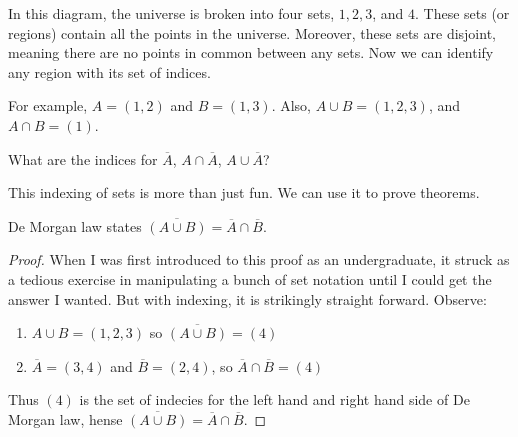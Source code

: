\begin{example}
In this diagram, the universe is broken into four sets, $1, 2, 3$, and $4$.  These sets (or regions) contain all the points in the universe. Moreover, these sets are disjoint, meaning there are no points in common between any sets.  Now we can identify any region with its set of indices. 
\begin{center}
\end{center}

For example, $A = (1,2)$ and $B = (1,3)$.  Also, $A\cup B = (1, 2, 3)$, and $A\cap B = (1)$.
\end{example}

\begin{problem}
What are the indices for $\overline A$, $A\cap \overline A$, $A\cup \overline A$?
\end{problem}

This indexing of sets is more than just fun.  We can use it to prove theorems.  

\begin{theorem}
De Morgan law states $\overline {(A\cup B)} = \overline A\cap \overline B$.
\begin{proof}
When I was first introduced to this proof as an undergraduate, it struck as a tedious exercise in manipulating a bunch of set notation until I could get the answer I wanted.  But with indexing, it is strikingly straight forward.  Observe:

\begin{enumerate}
\item $A\cup B = (1, 2, 3)$ so $\overline{(A\cup B)} = (4)$
\item $\overline{A} = (3, 4)$ and $\overline{B}=(2, 4)$, so $\overline{A} \cap \overline{B} = (4)$
\end{enumerate}
Thus $(4)$ is the set of indecies for the left hand and right hand side of De Morgan law, hense $\overline{(A\cup B)}= \overline{A} \cap \overline{B}$.
\end{proof}
\end{theorem}

